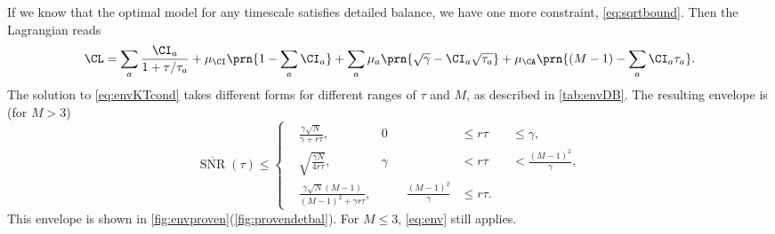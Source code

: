 \documentclass[12pt]{article}
\newcommand{\kktm}{\mu}
\DeclareMathOperator{\snr}{SNR}
\newcommand{\snrb}{\overline{\snr}}
\newcommand{\cnst}{\gamma}
\begin{document}
If we know that the optimal model for any timescale satisfies detailed balance, we have one more constraint, \cref{eq:sqrtbound}.
Then the Lagrangian reads
%
\begin{equation}\label{eq:envDBlagrangian}
  \CL = \sum_a \frac{\CI_a}{1+\tau/\tau_a} + \kktm_\CI \prn{1 - \sum_a \CI_a} 
      + \sum_a \kktm_a \prn{\sqrt{\cnst} - \CI_a \sqrt{\tau_a}} + \kktm_\CA \prn{(M-1) - \sum_a \CI_a \tau_a}.
\end{equation}
%
The solution to \cref{eq:envKTcond} takes different forms for different ranges of \(\tau\) and \(M\),
as described in \cref{tab:envDB}.
The resulting envelope is (for \(M > 3\))
%
\begin{equation}\label{eq:envDB}
  \snrb(\tau) \leq 
  \left\{ 
  \begin{alignedat}{3}
    &\frac{\cnst \sqrt{N}}{\cnst + r \tau}
      , &
      0 &\leq r \tau &&\leq \cnst
      , \\
    &\sqrt{\frac{\cnst N}{4 r \tau}}
      , &
      \cnst &< r \tau &&< \frac{(M-1)^2}{\cnst}
      , \\
    &\frac{\cnst \sqrt{N} (M-1)}{(M-1)^2 + \cnst r \tau}
      , &\qquad
      \frac{(M-1)^2}{\cnst} &\leq r \tau 
      .
  \end{alignedat}
  \right.
\end{equation}
%
This envelope is shown in \cref{fig:envproven}(\ref{fig:provendetbal}).
For \(M \leq 3\), \cref{eq:env} still applies.
\end{document}

